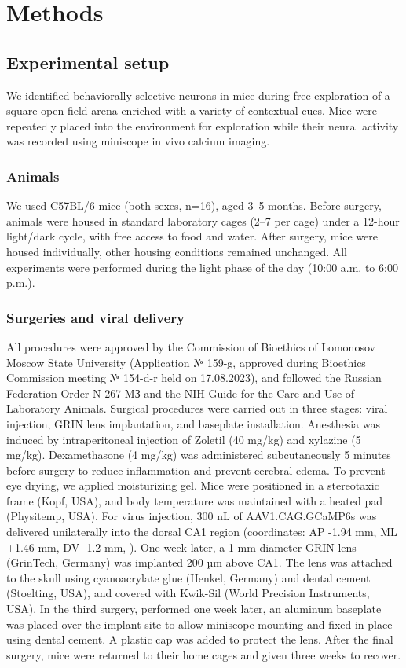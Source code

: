 \section{Methods}
\label{sec:methods}

\subsection{Experimental setup}
\label{sec:experimental_setup}
We identified behaviorally selective neurons in mice during free exploration of a square open field arena enriched with a variety of contextual cues. Mice were repeatedly placed into the environment for exploration while their neural activity was recorded using miniscope in vivo calcium imaging.

\subsubsection{Animals}
\label{sec:animals}
We used C57BL/6 mice (both sexes, n=16), aged 3--5 months. Before surgery, animals were housed in standard laboratory cages (2--7 per cage) under a 12-hour light/dark cycle, with free access to food and water. After surgery, mice were housed individually, other housing conditions remained unchanged. All experiments were performed during the light phase of the day (10:00 a.m. to 6:00 p.m.).

\subsubsection{Surgeries and viral delivery}
\label{sec:surgeries}
All procedures were approved by the Commission of Bioethics of Lomonosov Moscow State University (Application № 159-g, approved during Bioethics Commission meeting № 154-d-r held on 17.08.2023), and followed the Russian Federation Order N 267 MЗ  and the NIH Guide for the Care and Use of Laboratory Animals.
Surgical procedures were carried out in three stages: viral injection, GRIN lens implantation, and baseplate installation. Anesthesia was induced by intraperitoneal injection of Zoletil (40 mg/kg) and xylazine (5 mg/kg). Dexamethasone (4 mg/kg) was administered subcutaneously 5 minutes before surgery to reduce inflammation and prevent cerebral edema. To prevent eye drying, we applied moisturizing gel. Mice were positioned in a stereotaxic frame (Kopf, USA), and body temperature was maintained with a heated pad (Physitemp, USA). For virus injection, 300 nL of AAV1.CAG.GCaMP6s was delivered unilaterally into the dorsal CA1 region (coordinates: AP -1.94 mm, ML +1.46 mm, DV -1.2 mm, \cite{Paxinos2019}). One week later, a 1-mm-diameter GRIN lens (GrinTech, Germany) was implanted 200 µm above CA1. The lens was attached to the skull using cyanoacrylate glue (Henkel, Germany) and dental cement (Stoelting, USA), and covered with Kwik-Sil (World Precision Instruments, USA). In the third surgery, performed one week later, an aluminum baseplate was placed over the implant site to allow miniscope mounting and fixed in place using dental cement. A plastic cap was added to protect the lens. After the final surgery, mice were returned to their home cages and given three weeks to recover.

